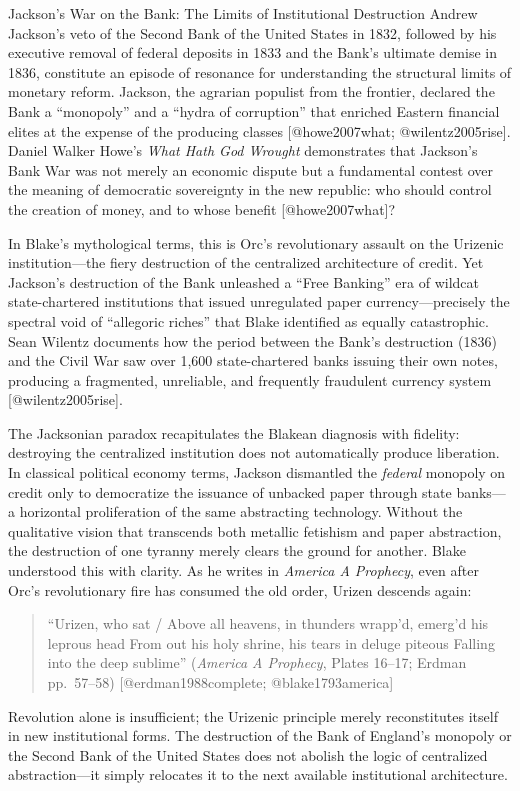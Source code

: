 \documentclass[
  ignorenonframetext,
]{beamer}
\begin{document}
\begin{frame}{Jackson's War on the Bank: The Limits of Institutional
Destruction}
\protect{}\label{jacksons-war-on-the-bank-the-limits-of-institutional-destruction}
Andrew Jackson's veto of the Second Bank of the United States in 1832,
followed by his executive removal of federal deposits in 1833 and the
Bank's ultimate demise in 1836, constitute an episode of resonance for
understanding the structural limits of monetary reform. Jackson, the
agrarian populist from the frontier, declared the Bank a ``monopoly''
and a ``hydra of corruption'' that enriched Eastern financial elites at
the expense of the producing classes {[}@howe2007what;
@wilentz2005rise{]}. Daniel Walker Howe's \emph{What Hath God Wrought}
demonstrates that Jackson's Bank War was not merely an economic dispute
but a fundamental contest over the meaning of democratic sovereignty in
the new republic: who should control the creation of money, and to whose
benefit {[}@howe2007what{]}?

In Blake's mythological terms, this is Orc's revolutionary assault on
the Urizenic institution---the fiery destruction of the centralized
architecture of credit. Yet Jackson's destruction of the Bank unleashed
a ``Free Banking'' era of wildcat state-chartered institutions that
issued unregulated paper currency---precisely the spectral void of
``allegoric riches'' that Blake identified as equally catastrophic. Sean
Wilentz documents how the period between the Bank's destruction (1836)
and the Civil War saw over 1,600 state-chartered banks issuing their own
notes, producing a fragmented, unreliable, and frequently fraudulent
currency system {[}@wilentz2005rise{]}.

The Jacksonian paradox recapitulates the Blakean diagnosis with
fidelity: destroying the centralized institution does not automatically
produce liberation. In classical political economy terms, Jackson
dismantled the \emph{federal} monopoly on credit only to democratize the
issuance of unbacked paper through state banks---a horizontal
proliferation of the same abstracting technology. Without the
qualitative vision that transcends both metallic fetishism and paper
abstraction, the destruction of one tyranny merely clears the ground for
another. Blake understood this with clarity. As he writes in
\emph{America A Prophecy}, even after Orc's revolutionary fire has
consumed the old order, Urizen descends again:

\begin{quote}
``Urizen, who sat / Above all heavens, in thunders wrapp'd, emerg'd his
leprous head From out his holy shrine, his tears in deluge piteous
Falling into the deep sublime'' (\emph{America A Prophecy}, Plates
16--17; Erdman pp.~57--58) {[}@erdman1988complete; @blake1793america{]}
\end{quote}

Revolution alone is insufficient; the Urizenic principle merely
reconstitutes itself in new institutional forms. The destruction of the
Bank of England's monopoly or the Second Bank of the United States does
not abolish the logic of centralized abstraction---it simply relocates
it to the next available institutional architecture.
\end{frame}
\end{document}
